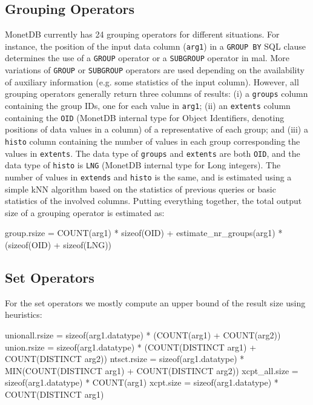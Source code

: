 \documentclass[conference]{IEEEtran}
\def\Skip{\par\medskip\nobreak\noindent}
\begin{document}
\subsection{Grouping Operators}
MonetDB currently has 24 grouping operators for different situations.
For instance, the position of the input data column (\texttt{\small arg1}) in a \texttt{\small GROUP BY} SQL clause determines the use of a \texttt{\small GROUP} operator or a \texttt{\small SUBGROUP} operator in {\sc mal}.
More variations of \texttt{\small GROUP} or \texttt{\small SUBGROUP} operators are used depending on the availability of auxiliary information (e.g. some statistics of the input column).
However, all grouping operators generally return three columns of results: (i) a \texttt{\small groups} column containing the group IDs, one for each value in \texttt{\small arg1}; (ii) an \texttt{\small extents} column containing the \texttt{\small OID} (MonetDB internal type for Object Identifiers, denoting positions of data values in a column) of a representative of each group; and (iii) a \texttt{\small histo} column containing the number of values in each group corresponding the values in \texttt{\small extents}.
The data type of \texttt{\small groups} and \texttt{\small extents} are both \texttt{\small OID}, and the data type of \texttt{\small histo} is \texttt{\small LNG} (MonetDB internal type for Long integers).
The number of values in \texttt{\small extends} and \texttt{\small histo} is the same, and is estimated using a simple kNN algorithm based on the statistics of previous queries or basic statistics of the involved columns.
Putting everything together, the total output size of a grouping operator is estimated as:
\begin{verb}
group.rsize = COUNT(arg1) * sizeof(OID) +
  estimate_nr_groups(arg1) * (sizeof(OID) + sizeof(LNG))
\end{verb}

\subsection{Set Operators}
For the set operators we mostly compute an upper bound of the result size using heuristics:
\begin{verb}
unionall.rsize = sizeof(arg1.datatype) * 
  (COUNT(arg1) + COUNT(arg2))
union.rsize = sizeof(arg1.datatype) *
  (COUNT(DISTINCT arg1) + COUNT(DISTINCT arg2))
ntsct.rsize = sizeof(arg1.datatype) *
  MIN(COUNT(DISTINCT arg1) + COUNT(DISTINCT arg2))
xcpt_all.size = sizeof(arg1.datatype) * COUNT(arg1)
xcpt.size = sizeof(arg1.datatype) * COUNT(DISTINCT arg1)
\end{verb}
\end{document}
